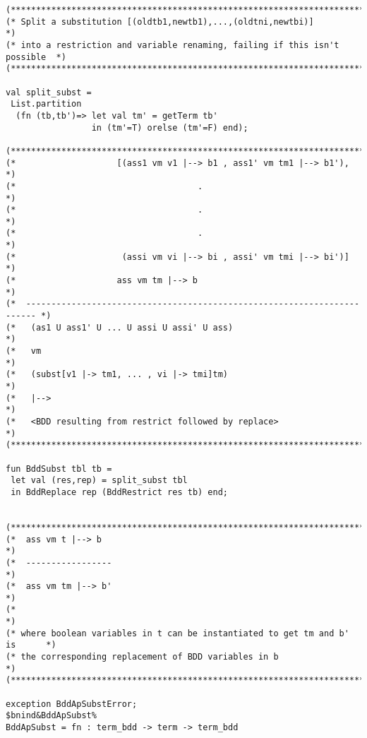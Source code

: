\documentclass[12pt]{article}
\begin{document}
\begin{footnotesize}
\begin{Verbatim}[commandchars=\$\&\%]
(*****************************************************************************)
(* Split a substitution [(oldtb1,newtb1),...,(oldtni,newtbi)]                *)
(* into a restriction and variable renaming, failing if this isn't possible  *)
(*****************************************************************************) 

val split_subst =
 List.partition 
  (fn (tb,tb')=> let val tm' = getTerm tb' 
                 in (tm'=T) orelse (tm'=F) end);

(*****************************************************************************)
(*                    [(ass1 vm v1 |--> b1 , ass1' vm tm1 |--> b1'),         *)
(*                                    .                                      *)
(*                                    .                                      *)
(*                                    .                                      *)
(*                     (assi vm vi |--> bi , assi' vm tmi |--> bi')]         *)
(*                    ass vm tm |--> b                                       *)
(*  ------------------------------------------------------------------------ *)
(*   (as1 U ass1' U ... U assi U assi' U ass)                                *)
(*   vm                                                                      *)
(*   (subst[v1 |-> tm1, ... , vi |-> tmi]tm)                                 *)
(*   |-->                                                                    *)
(*   <BDD resulting from restrict followed by replace>                       *)
(*****************************************************************************)

fun BddSubst tbl tb =
 let val (res,rep) = split_subst tbl
 in BddReplace rep (BddRestrict res tb) end;


(*****************************************************************************)
(*  ass vm t |--> b                                                          *)
(*  -----------------                                                        *)
(*  ass vm tm |--> b'                                                        *)
(*                                                                           *)
(* where boolean variables in t can be instantiated to get tm and b' is      *)
(* the corresponding replacement of BDD variables in b                       *)
(*****************************************************************************)

exception BddApSubstError;
$bnind&BddApSubst%
BddApSubst = fn : term_bdd -> term -> term_bdd


\end{Verbatim}
\end{footnotesize}
\end{document}
